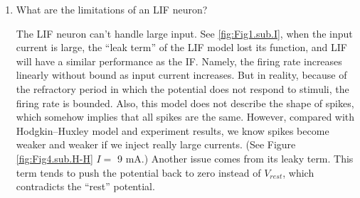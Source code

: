 \documentclass[11pt]{article}
\begin{document}
\begin{enumerate}
		\item What are the limitations of an LIF neuron?
			
		The LIF neuron can't handle large input. See \ref{fig:Fig1.sub.I}, when the input current is large, the ``leak term'' of the LIF model lost its function, and LIF will have a similar performance as the IF. Namely, the firing rate increases linearly without bound as input current increases. But in reality, because of the refractory period in which the potential does not respond to stimuli, the firing rate is bounded. Also, this model does not describe the shape of spikes, which somehow implies that all spikes are the same. However, compared with Hodgkin–Huxley model and experiment results, we know spikes become weaker and weaker if we inject really large currents. (See Figure \ref{fig:Fig4.sub.H-H} $I =$ 9 mA.) Another issue comes from its leaky term. This term tends to push the potential back to zero instead of $V_{rest}$, which contradicts the ``rest'' potential.	
			
	\end{enumerate}
	
\end{document}
